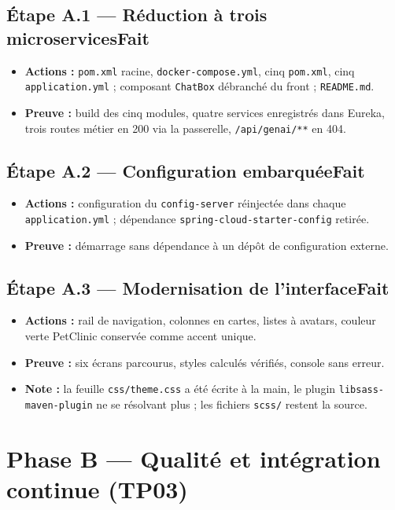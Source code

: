 \documentclass[12pt,a4paper]{article}
\newcommand{\code}[1]{\texttt{\small #1}}
\newcommand{\fait}{\hfill\textcolor{green!45!black}{\small\textbf{Fait}}}
\newcommand{\afaire}{\hfill\textcolor{orange!80!black}{\small\textbf{\`A faire}}}
\newcommand{\etape}[2]{%
  \subsection*{#1\ifstrequal{#2}{f}{\fait}{\afaire}}%
}
\begin{document}
\etape{\'Etape A.1 --- R\'eduction \`a trois microservices}{f}
\begin{itemize}[leftmargin=1.4em,itemsep=0.1em]
  \item \textbf{Actions :} \code{pom.xml} racine, \code{docker-compose.yml}, cinq \code{pom.xml},
        cinq \code{application.yml} ; composant \code{ChatBox} d\'ebranch\'e du front ; \code{README.md}.
  \item \textbf{Preuve :} build des cinq modules, quatre services enregistr\'es dans Eureka,
        trois routes m\'etier en 200 via la passerelle, \code{/api/genai/**} en 404.
\end{itemize}

\etape{\'Etape A.2 --- Configuration embarqu\'ee}{f}
\begin{itemize}[leftmargin=1.4em,itemsep=0.1em]
  \item \textbf{Actions :} configuration du \code{config-server} r\'einject\'ee dans chaque
        \code{application.yml} ; d\'ependance \code{spring-cloud-starter-config} retir\'ee.
  \item \textbf{Preuve :} d\'emarrage sans d\'ependance \`a un d\'ep\^ot de configuration externe.
\end{itemize}

\etape{\'Etape A.3 --- Modernisation de l'interface}{f}
\begin{itemize}[leftmargin=1.4em,itemsep=0.1em]
  \item \textbf{Actions :} rail de navigation, colonnes en cartes, listes \`a avatars,
        couleur verte PetClinic conserv\'ee comme accent unique.
  \item \textbf{Preuve :} six \'ecrans parcourus, styles calcul\'es v\'erifi\'es, console sans erreur.
  \item \textbf{Note :} la feuille \code{css/theme.css} a \'et\'e \'ecrite \`a la main, le plugin
        \code{libsass-maven-plugin} ne se r\'esolvant plus ; les fichiers \code{scss/} restent la source.
\end{itemize}

\section{Phase B --- Qualit\'e et int\'egration continue (TP03)}
\end{document}
